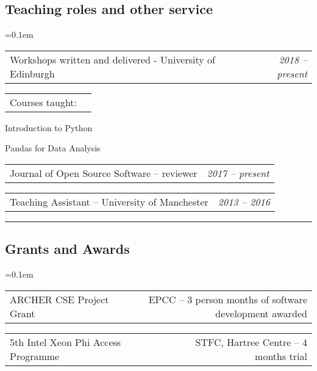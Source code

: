 \documentclass[10.5pt,a4]{article}
\makeatletter
\newenvironment{indentsection}[1]%
{\begin{list}{}%
	{\setlength{\leftmargin}{#1}}%
	\item[]%
}
{\end{list}}
\newcommand{\headerrow}[2]
{\begin{tabular*}{\linewidth}{l@{\extracolsep{\fill}}r}
	#1 &
	#2 \\
\end{tabular*}}
\makeatother
\begin{document}
\subsection*{Teaching roles and other service} 
	\parskip=0.1em
\begin{itemize*}
	\item
	\headerrow
		 {Workshops written and delivered - University of Edinburgh}
		 {\textit{2018 -- present}}
  \headerrow
      {Courses taught:}
      {}
		\begin{itemize*}
		\item Introduction to Python
    \item Pandas for Data Analysis
		\end{itemize*}
	\item
	\headerrow
		 {Journal of Open Source Software -- reviewer}
		 {\textit{2017 -- present}}
	\item
	\headerrow
		 {Teaching Assistant -- University of Manchester}
		 {\textit{2013 -- 2016}}
\end{itemize*}

\hrule
\vspace{-0.4em}
\subsection*{Grants and Awards}
	\parskip=0.1em
\begin{itemize*}
	\item 
	\headerrow 
	  {ARCHER CSE Project Grant}
	  {EPCC -- 3 person months of software development awarded}

	\item 
	\headerrow 
	  {5th Intel Xeon Phi Access Programme}
	  {STFC, Hartree Centre -- 4 months trial}



\end{itemize*}


%
%
%
%
\end{document}
